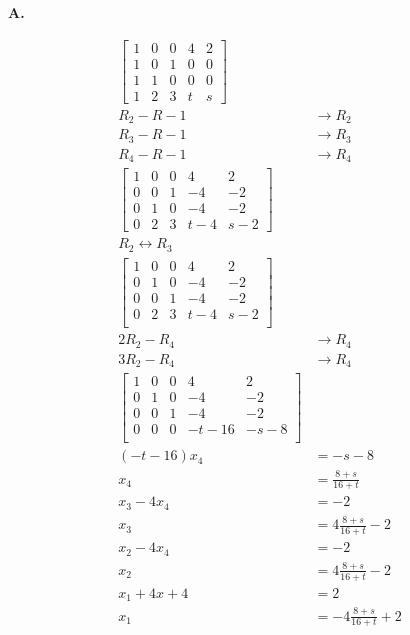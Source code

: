 \documentclass[main.tex]{subfiles}
\begin{document}
\begin{enumerate}
    \textbf{A.}
    
    $$
    \begin{aligned}
    \left[\begin{array}{llll|l}
    1 & 0 & 0 & 4 & 2\\
    1 & 0 & 1 & 0 & 0\\
    1 & 1 & 0 & 0 & 0\\
    1 & 2 & 3 & t & s
    \end{array}\right]&\\
    R_2-R-1 &\rightarrow R_2\\
    R_3-R-1 &\rightarrow R_3\\
    R_4-R-1 &\rightarrow R_4\\
    \left[\begin{array}{llll|l}
    1 & 0 & 0 & 4 & 2\\
    0 & 0 & 1 & -4 & -2\\
    0 & 1 & 0 & -4 & -2\\
    0 & 2 & 3 & t-4 & s-2
    \end{array}\right]&\\
    R_2 \leftrightarrow R_3\\
    \left[\begin{array}{llll|l}
    1 & 0 & 0 & 4 & 2\\
    0 & 1 & 0 & -4 & -2\\
    0 & 0 & 1 & -4 & -2\\
    0 & 2 & 3 & t-4 & s-2\\
    \end{array}\right]&\\
    2R_2-R_4 &\rightarrow R_4\\
    3R_2-R_4 &\rightarrow R_4\\
    \left[\begin{array}{llll|l}
    1 & 0 & 0 & 4 & 2\\
    0 & 1 & 0 & -4 & -2\\
    0 & 0 & 1 & -4 & -2\\
    0 & 0 & 0 & -t-16 & -s-8\\
    \end{array}\right]&\\
    (-t-16)x_4 & = -s-8\\
    x_4 & = \frac{8+s}{16+t}\\
    x_3 - 4x_4 &= -2\\
    x_3 & = 4\frac{8+s}{16+t} - 2\\
    x_2 - 4x_4 & = -2\\
    x_2 & = 4\frac{8+s}{16+t} - 2\\
    x_1 + 4x+4 &= 2\\
    x_1 & = -4\frac{8+s}{16+t} + 2
    \end{aligned}
    $$
    
    
\end{enumerate}
\end{document}
